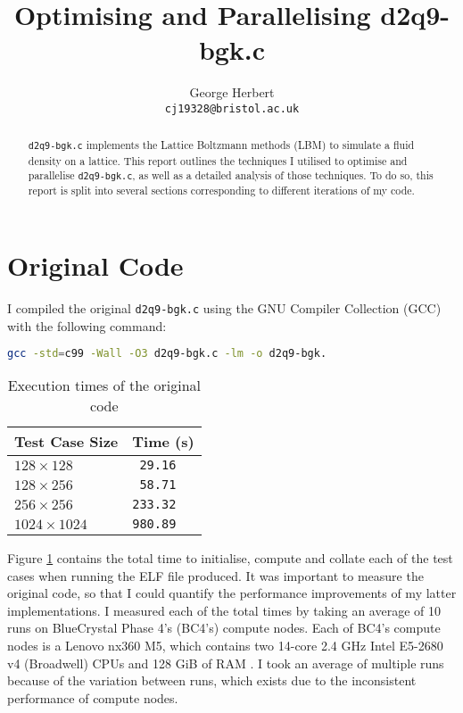 \documentclass[11pt, twocolumn, a4paper]{article}
\author{
    George Herbert\\
    \texttt{cj19328@bristol.ac.uk}
}
\title{Optimising and Parallelising d2q9-bgk.c}
\begin{document}
\maketitle

\begin{abstract}
    \texttt{d2q9-bgk.c} implements the Lattice Boltzmann methods (LBM) to simulate a fluid density on a lattice.
    This report outlines the techniques I utilised to optimise and parallelise \texttt{d2q9-bgk.c}, as well as a detailed analysis of those techniques.
    To do so, this report is split into several sections corresponding to different iterations of my code.
\end{abstract}

\section{Original Code}

I compiled the original \texttt{d2q9-bgk.c} using the GNU Compiler Collection (GCC) with the following command:
\begin{lstlisting}[language=bash, breaklines=true, breakatwhitespace=true]
gcc -std=c99 -Wall -O3 d2q9-bgk.c -lm -o d2q9-bgk.
\end{lstlisting}

\begin{table}[htbp]
    \begin{center}
    \caption{Execution times of the original code}\label{tab:original}
    \begin{tabular}{l | l} 
        \hline\hline
        Test Case Size&Time (s)\\
        \hline
        $128 \times 128$&\texttt{ 29.16}\\
        $128 \times 256$&\texttt{ 58.71}\\
        $256 \times 256$&\texttt{233.32}\\
        $1024 \times 1024$&\texttt{980.89}\\
        \hline
      \end{tabular}
    \end{center}
\end{table} 

Figure \ref{tab:original} contains the total time to initialise, compute and collate each of the test cases when running the ELF file produced.
It was important to measure the original code, so that I could quantify the performance improvements of my latter implementations.
I measured each of the total times by taking an average of 10 runs on BlueCrystal Phase 4's (BC4's) compute nodes.
Each of BC4's compute nodes is a Lenovo nx360 M5, which contains two 14-core 2.4 GHz Intel E5-2680 v4 (Broadwell) CPUs and 128 GiB of RAM \cite{bcp4}.
I took an average of multiple runs because of the variation between runs, which exists due to the inconsistent performance of compute nodes.
\end{document}
